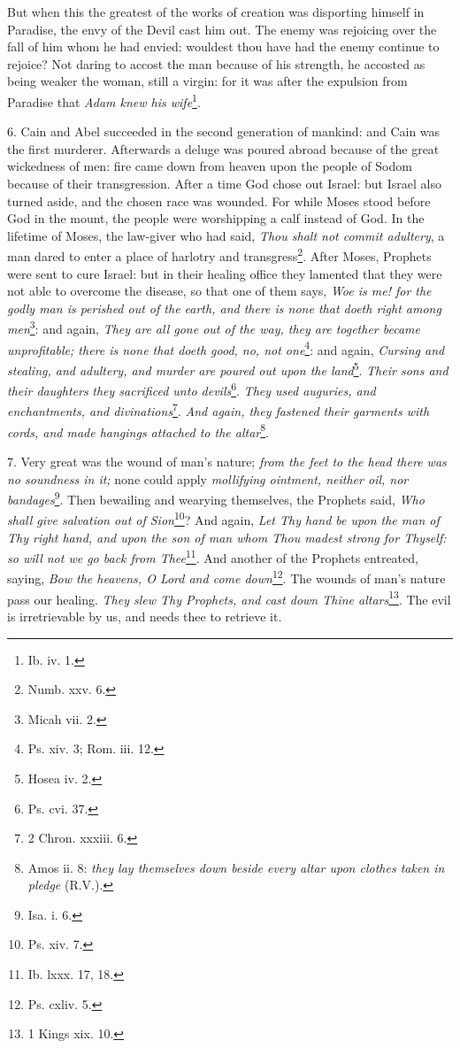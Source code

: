 But when this the greatest of the works of creation was disporting himself in Paradise, the envy of the Devil cast him out. The enemy was rejoicing over the fall of him whom he had envied: wouldest thou have had the enemy continue to rejoice? Not daring to accost the man because of his strength, he accosted as being weaker the woman, still a virgin: for it was after the expulsion from Paradise that \emph{Adam knew his wife}\footnote{Ib. iv. 1.}.

6. Cain and Abel succeeded in the second generation of mankind: and Cain was the first murderer. Afterwards a deluge was poured abroad because of the great wickedness of men: fire came down from heaven upon the people of Sodom because of their transgression. After a time God chose out Israel: but Israel also turned aside, and the chosen race was wounded. For while Moses stood before God in the mount, the people were worshipping a calf instead of God. In the lifetime of Moses, the law-giver who had said, \emph{Thou shalt not commit adultery}, a man dared to enter a place of harlotry and transgress\footnote{Numb. xxv. 6.}. After Moses, Prophets were sent to cure Israel: but in their healing office they lamented that they were not able to overcome the disease, so that one of them says, \emph{Woe is me! for the godly man is perished out of the earth, and there is none that doeth right among men}\footnote{Micah vii. 2.}: and again, \emph{They are all gone out of the way, they are together became unprofitable; there is none that doeth good, no, not one}\footnote{Ps. xiv. 3; Rom. iii. 12.}: and again, \emph{Cursing and stealing, and adultery, and murder are poured out upon the land}\footnote{Hosea iv. 2.}. \emph{Their sons and their daughters} \emph{they sacrificed unto devils}\footnote{Ps. cvi. 37.}. \emph{They used auguries, and enchantments, and divinations}\footnote{2 Chron. xxxiii. 6.}. \emph{And again, they fastened their garments with cords, and made hangings attached to the altar}\footnote{Amos ii. 8: \emph{they lay themselves down beside every altar upon clothes taken in pledge} (R.V.).}.

7. Very great was the wound of man’s nature; \emph{from the feet to the head there was no soundness in it;} none could apply \emph{mollifying ointment, neither oil, nor bandages}\footnote{Isa. i. 6.}. Then bewailing and wearying themselves, the Prophets said, \emph{Who shall give salvation out of Sion}\footnote{Ps. xiv. 7.}? And again, \emph{Let Thy hand be upon the man of Thy right hand, and upon the son of man whom Thou madest strong for Thyself: so will not we go back from Thee}\footnote{Ib. lxxx. 17, 18.}. And another of the Prophets entreated, saying, \emph{Bow the heavens, O Lord and come down}\footnote{Ps. cxliv. 5.}. The wounds of man’s nature pass our healing. \emph{They slew Thy Prophets, and cast down Thine altars}\footnote{1 Kings xix. 10.}. The evil is irretrievable by us, and needs thee to retrieve it.

